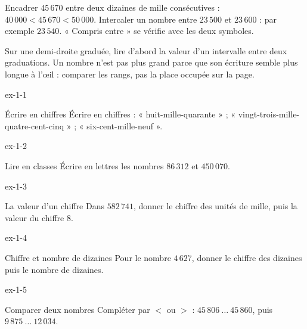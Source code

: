\begin{savoirfaire}Encadrer $45\,670$ entre deux dizaines de mille consécutives : $40\,000<45\,670<50\,000$. Intercaler un nombre entre $23\,500$ et $23\,600$ : par exemple $23\,540$. « Compris entre » se vérifie avec les deux symboles.\end{savoirfaire}
\begin{attention}Sur une demi-droite graduée, lire d’abord la valeur d’un intervalle entre deux graduations. Un nombre n’est pas plus grand parce que son écriture semble plus longue à l’œil : comparer les rangs, pas la place occupée sur la page.\end{attention}

\clearpage{}
\begin{blocLivre}{ex-1-1}\begin{exercice}[1]{Écrire en chiffres}
Écrire en chiffres : « huit-mille-quarante » ; « vingt-trois-mille-quatre-cent-cinq » ; « six-cent-mille-neuf ».
\end{exercice}\end{blocLivre}
\begin{blocLivre}{ex-1-2}\begin{exercice}[1]{Lire en classes}
Écrire en lettres les nombres $86\,312$ et $450\,070$.
\end{exercice}\end{blocLivre}
\begin{blocLivre}{ex-1-3}\begin{exercice}[1]{La valeur d’un chiffre}
Dans $582\,741$, donner le chiffre des unités de mille, puis la valeur du chiffre 8.
\end{exercice}\end{blocLivre}
\begin{blocLivre}{ex-1-4}\begin{exercice}[1]{Chiffre et nombre de dizaines}
Pour le nombre $4\,627$, donner le chiffre des dizaines puis le nombre de dizaines.
\end{exercice}\end{blocLivre}
\begin{blocLivre}{ex-1-5}\begin{exercice}[1]{Comparer deux nombres}
Compléter par $<$ ou $>$ : $45\,806\ \ldots\ 45\,860$, puis $9\,875\ \ldots\ 12\,034$.
\end{exercice}\end{blocLivre}

